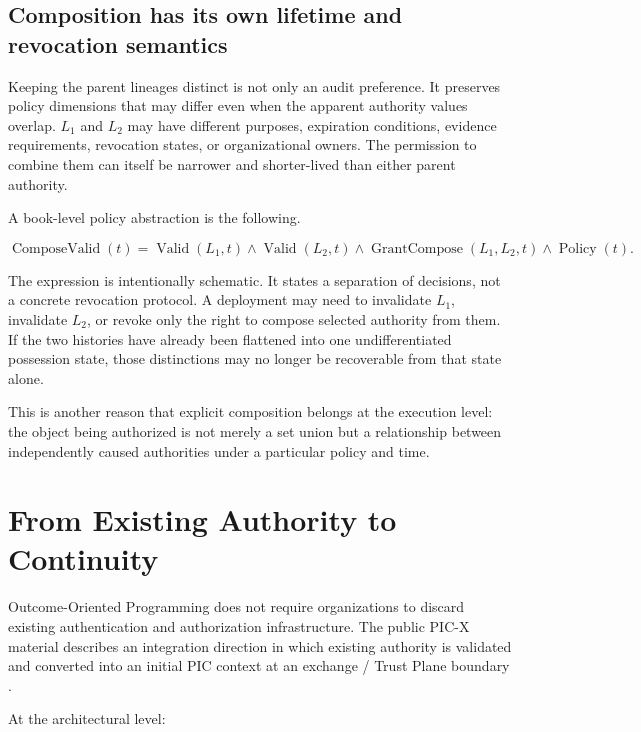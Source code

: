 \documentclass[10pt,oneside,openany]{book}
\begin{document}
\section{Composition has its own lifetime and revocation semantics}
Keeping the parent lineages distinct is not only an audit preference. It preserves policy dimensions that may differ even when the apparent authority values overlap. $L_1$ and $L_2$ may have different purposes, expiration conditions, evidence requirements, revocation states, or organizational owners. The permission to combine them can itself be narrower and shorter-lived than either parent authority.

A book-level policy abstraction is the following.
\begin{formulabox}
\[
\operatorname{ComposeValid}(t)=
\operatorname{Valid}(L_1,t)\land
\operatorname{Valid}(L_2,t)\land
\operatorname{GrantCompose}(L_1,L_2,t)\land
\operatorname{Policy}(t).
\]
\end{formulabox}
The expression is intentionally schematic. It states a separation of decisions, not a concrete revocation protocol. A deployment may need to invalidate $L_1$, invalidate $L_2$, or revoke only the right to compose selected authority from them. If the two histories have already been flattened into one undifferentiated possession state, those distinctions may no longer be recoverable from that state alone.

This is another reason that explicit composition belongs at the execution level: the object being authorized is not merely a set union but a relationship between independently caused authorities under a particular policy and time.

\chapter{From Existing Authority to Continuity}

Outcome-Oriented Programming does not require organizations to discard existing authentication and authorization infrastructure. The public PIC-X material describes an integration direction in which existing authority is validated and converted into an initial PIC context at an exchange / Trust Plane boundary \cite{picxarch,picxinitial}.

At the architectural level:
\end{document}
